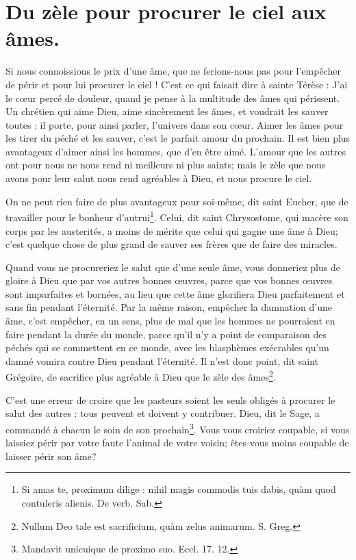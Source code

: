\documentclass[instructions.tex]{subfiles}
\begin{document}
 
\chapter{Du zèle pour procurer le ciel aux âmes.}
 
\primo Si nous connoissions le prix d’une âme, que ne ferions-nous pas pour l’empêcher de périr et pour lui procurer le ciel ! C’est ce qui faisait dire à sainte Térèse : J’ai le cœur percé de douleur, quand je pense à la multitude des âmes qui périssent. Un chrétien qui aime Dieu, aime sincèrement les âmes, et voudrait les sauver toutes : il porte, pour ainsi parler, l’univers dans son cœur. Aimer les âmes pour les tirer du péché et les sauver, c’est le parfait amour du prochain. Il est bien plus avantageux d’aimer ainsi les hommes, que d’en être aimé. L’amour que les autres ont pour nous ne nous rend ni meilleurs ni plus saints; mais le zèle que nous avons pour leur salut nous rend agréables à Dieu, et nous procure le ciel.
 
On ne peut rien faire de plus avantageux pour soi-même, dit saint Eucher, que de travailler pour le bonheur d’autrui\footnote{Si amas te, proximum dilige : nihil magis commodis tuis dabis, quàm quod contuleris alienis. De verb. Sab.}. Celui, dit saint Chrysostome, qui macère son corps par les austerités, a moins de mérite que celui qui gagne une âme à Dieu; c’est quelque chose de plus grand de sauver ses frères que de faire des miracles.
 
Quand vous ne procureriez le salut que d’une seule âme, vous donneriez plus de gloire à Dieu que par vos autres bonnes œuvres, parce que vos bonnes œuvres sont imparfaites et bornées, au lieu que cette âme glorifiera Dieu parfaitement et sans fin pendant l’éternité. Par la même raison, empêcher la damnation d’une âme, c’est empêcher, en un sens, plus de mal que les hommes ne pourraient en faire pendant la durée du monde, parce qu’il n’y a point de comparaison des péchés qui se commettent en ce monde, avec les blasphèmes exécrables qu’un damné vomira contre Dieu pendant l’éternité. Il n’est donc point, dit saint Grégoire, de sacrifice plus agréable à Dieu que le zèle des âmes\footnote{Nullum Deo tale est sacrificium, quàm zelus animarum. S. Greg.}.
 
\secundo C’est une erreur de croire que les pasteurs soient les seuls obligés à procurer le salut des autres : tous peuvent et doivent y contribuer. Dieu, dit le Sage, a commandé à chacun le soin de son prochain\footnote{Mandavit unicuique de proximo suo. Eccl. 17. 12.}. Vous vous croiriez coupable, si vous laissiez périr par votre faute l’animal de votre voisin; êtes-vous moins coupable de laisser périr son âme?
 
\end{document}
